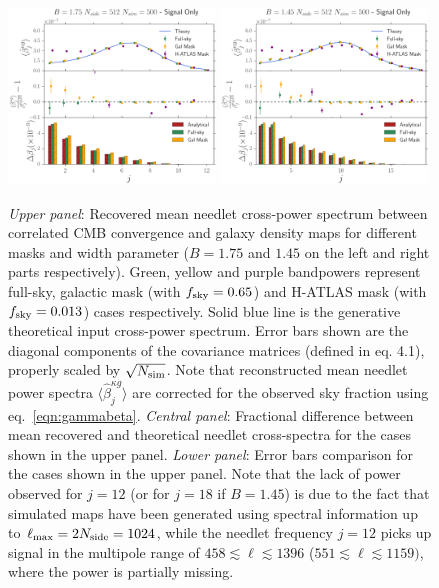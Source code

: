\documentclass[a4paper,11pt]{article}
\begin{document}
\begin{figure}[tbp]
\centering %
\includegraphics[width=0.49\textwidth]{images/pipeline_val_needlet_nside512_nsim500_jmax12.pdf}
\includegraphics[width=0.49\textwidth]{images/pipeline_val_needlet_nside512_nsim500_jmax18.pdf}
\caption{\label{fig:needsims} \emph{Upper panel}: Recovered mean needlet cross-power spectrum  
between correlated CMB convergence and galaxy density maps for different masks and width parameter
($B=1.75$ and $1.45$ on the left and right parts respectively). Green, yellow and purple 
bandpowers represent full-sky, galactic mask (with $f_{\rm sky} = 0.65$) and H-ATLAS mask (with $f_{\rm 
sky} = 0.013$) cases respectively. Solid blue line is the generative theoretical input cross-power spectrum. 
Error bars shown are the diagonal components of the covariance matrices (defined in eq. 4.1), properly 
scaled by $\sqrt{N_{\rm sim}}$. Note that reconstructed mean needlet power spectra $\langle \hat{\beta}^{\kappa g}_j \rangle$ are corrected for the observed sky fraction using eq.~\ref{eqn:gammabeta}. \emph{Central panel}: Fractional difference between mean recovered and 
theoretical needlet cross-spectra for the cases shown in the upper panel. \emph{Lower panel}: Error bars 
comparison for the cases shown in the upper panel. Note that the 
lack of power observed for $j = 12$ (or for $j=18$ if $B=1.45$) is due to the fact that simulated maps have been generated using 
spectral information up to $\ell_{\rm max}=2N_{\rm side}= 1024$, while the needlet frequency $j=12$
picks up signal in the multipole range of $458 \lesssim \ell \lesssim 1396$ ($551 \lesssim \ell \lesssim 1159)$, where the power is partially 
missing.}
\end{figure}
\end{document}
